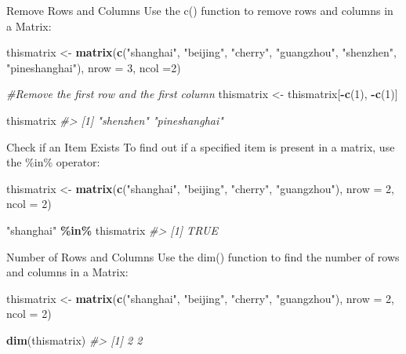 \documentclass[
]{book}
\newenvironment{Shaded}{\begin{snugshade}}{\end{snugshade}}
\newcommand{\AttributeTok}[1]{\textcolor[rgb]{0.13,0.29,0.53}{#1}}
\newcommand{\CommentTok}[1]{\textcolor[rgb]{0.56,0.35,0.01}{\textit{#1}}}
\newcommand{\DecValTok}[1]{\textcolor[rgb]{0.00,0.00,0.81}{#1}}
\newcommand{\FunctionTok}[1]{\textcolor[rgb]{0.13,0.29,0.53}{\textbf{#1}}}
\newcommand{\NormalTok}[1]{#1}
\newcommand{\OtherTok}[1]{\textcolor[rgb]{0.56,0.35,0.01}{#1}}
\newcommand{\SpecialCharTok}[1]{\textcolor[rgb]{0.81,0.36,0.00}{\textbf{#1}}}
\newcommand{\StringTok}[1]{\textcolor[rgb]{0.31,0.60,0.02}{#1}}
\begin{document}
Remove Rows and Columns
Use the c() function to remove rows and columns in a Matrix:

\begin{Shaded}
\begin{Highlighting}[]
\NormalTok{thismatrix }\OtherTok{\textless{}{-}} \FunctionTok{matrix}\NormalTok{(}\FunctionTok{c}\NormalTok{(}\StringTok{"shanghai"}\NormalTok{, }\StringTok{"beijing"}\NormalTok{, }\StringTok{"cherry"}\NormalTok{, }\StringTok{"guangzhou"}\NormalTok{, }\StringTok{"shenzhen"}\NormalTok{, }\StringTok{"pineshanghai"}\NormalTok{), }\AttributeTok{nrow =} \DecValTok{3}\NormalTok{, }\AttributeTok{ncol =}\DecValTok{2}\NormalTok{)}

\CommentTok{\#Remove the first row and the first column}
\NormalTok{thismatrix }\OtherTok{\textless{}{-}}\NormalTok{ thismatrix[}\SpecialCharTok{{-}}\FunctionTok{c}\NormalTok{(}\DecValTok{1}\NormalTok{), }\SpecialCharTok{{-}}\FunctionTok{c}\NormalTok{(}\DecValTok{1}\NormalTok{)]}

\NormalTok{thismatrix}
\CommentTok{\#\textgreater{} [1] "shenzhen"     "pineshanghai"}
\end{Highlighting}
\end{Shaded}

Check if an Item Exists
To find out if a specified item is present in a matrix, use the \%in\% operator:

\begin{Shaded}
\begin{Highlighting}[]
\NormalTok{thismatrix }\OtherTok{\textless{}{-}} \FunctionTok{matrix}\NormalTok{(}\FunctionTok{c}\NormalTok{(}\StringTok{"shanghai"}\NormalTok{, }\StringTok{"beijing"}\NormalTok{, }\StringTok{"cherry"}\NormalTok{, }\StringTok{"guangzhou"}\NormalTok{), }\AttributeTok{nrow =} \DecValTok{2}\NormalTok{, }\AttributeTok{ncol =} \DecValTok{2}\NormalTok{)}

\StringTok{"shanghai"} \SpecialCharTok{\%in\%}\NormalTok{ thismatrix}
\CommentTok{\#\textgreater{} [1] TRUE}
\end{Highlighting}
\end{Shaded}

Number of Rows and Columns
Use the dim() function to find the number of rows and columns in a Matrix:

\begin{Shaded}
\begin{Highlighting}[]
\NormalTok{thismatrix }\OtherTok{\textless{}{-}} \FunctionTok{matrix}\NormalTok{(}\FunctionTok{c}\NormalTok{(}\StringTok{"shanghai"}\NormalTok{, }\StringTok{"beijing"}\NormalTok{, }\StringTok{"cherry"}\NormalTok{, }\StringTok{"guangzhou"}\NormalTok{), }\AttributeTok{nrow =} \DecValTok{2}\NormalTok{, }\AttributeTok{ncol =} \DecValTok{2}\NormalTok{)}

\FunctionTok{dim}\NormalTok{(thismatrix)}
\CommentTok{\#\textgreater{} [1] 2 2}
\end{Highlighting}
\end{Shaded}
\end{document}
